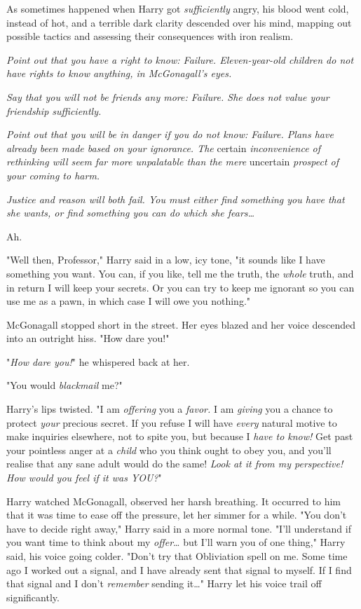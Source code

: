 As sometimes happened when Harry got \emph{sufficiently} angry, his blood went 
cold, instead of hot, and a terrible dark clarity descended over his mind, 
mapping out possible tactics and assessing their consequences with iron realism.

\emph{Point out that you have a right to know: Failure. Eleven-year-old 
children do not have rights to know anything, in McGonagall's eyes.}

\emph{Say that you will not be friends any more: Failure. She does not value 
your friendship sufficiently.}

\emph{Point out that you will be in danger if you do not know: Failure. Plans 
have already been made based on your ignorance. The} certain 
\emph{inconvenience of rethinking will seem far more unpalatable than the mere} 
uncertain \emph{prospect of your coming to harm.}

\emph{Justice and reason will both fail. You must either find something you 
have that she wants, or find something you can do which she fears{\ldots}}

Ah.

"Well then, Professor," Harry said in a low, icy tone, "it sounds like I have 
something you want. You can, if you like, tell me the truth, the \emph{whole} 
truth, and in return I will keep your secrets. Or you can try to keep me 
ignorant so you can use me as a pawn, in which case I will owe you nothing."

McGonagall stopped short in the street. Her eyes blazed and her voice descended 
into an outright hiss. "How dare you!"

"\emph{How dare you!}" he whispered back at her.

"You would \emph{blackmail} me?"

Harry's lips twisted. "I am \emph{offering} you a \emph{favor.} I am 
\emph{giving} you a chance to protect \emph{your} precious secret. If you 
refuse I will have \emph{every} natural motive to make inquiries elsewhere, not 
to spite you, but because I \emph{have to know!} Get past your pointless anger 
at a \emph{child} who you think ought to obey you, and you'll realise that any 
sane adult would do the same! \emph{Look at it from my perspective! How would 
you feel if it was YOU?}"

Harry watched McGonagall, observed her harsh breathing. It occurred to him that 
it was time to ease off the pressure, let her simmer for a while. "You don't 
have to decide right away," Harry said in a more normal tone. "I'll understand 
if you want time to think about my \emph{offer}{\ldots} but I'll warn you of 
one thing," Harry said, his voice going colder. "Don't try that Obliviation 
spell on me. Some time ago I worked out a signal, and I have already sent that 
signal to myself. If I find that signal and I don't \emph{remember} sending 
it{\ldots}" Harry let his voice trail off significantly.

